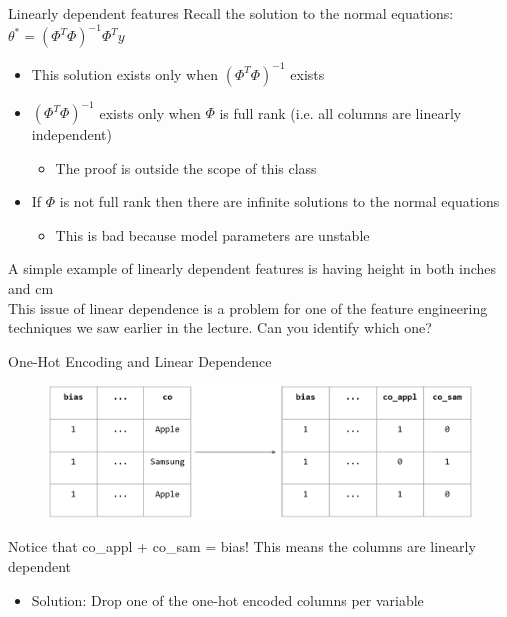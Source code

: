 \documentclass[aspectratio=169]{../latex_main/tntbeamer}  %
\begin{document}
	
	\begin{frame}[c]{Linearly dependent features}
	    Recall the solution to the normal equations: $\theta^* = (\Phi^T\Phi)^{-1}\Phi^Ty$
        \begin{itemize}
            \item This solution exists only when $(\Phi^T\Phi)^{-1}$ exists
            \item $(\Phi^T\Phi)^{-1}$  exists only when $\Phi$ is full rank (i.e. all columns are linearly independent)
            \begin{itemize}
                \item The proof is outside the scope of this class
            \end{itemize}
            \item If $\Phi$ is not full rank then there are infinite solutions to the normal equations
            \begin{itemize}
                \item This is bad because model parameters are unstable
            \end{itemize}
        \end{itemize}
        A simple example of linearly dependent features is having height in both inches and cm\\
        \bigskip
        This issue of linear dependence is a problem for one of the feature engineering techniques we saw earlier in the lecture. Can you identify which one?
	\end{frame}
	
	
	\begin{frame}{One-Hot Encoding and Linear Dependence}
	    \begin{figure}
	        \centering
	        \includegraphics[scale=.35]{Bild8}
	    \end{figure}
	    Notice that co\_appl + co\_sam = bias! This means the columns are linearly dependent
	    \begin{itemize}
	        \item Solution: Drop one of the one-hot encoded columns per variable
	    \end{itemize}
	\end{frame}
	
\end{document}
